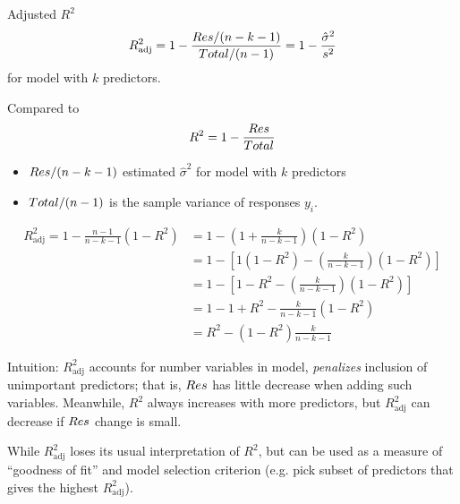 \begin{Definition}{Adjusted $ R^2 $}{}
      \[ R^2_{\text{adj}}=1-\frac{\relax{Res}/(n-k-1)}{
                  \relax{Total}/(n-1)
            }=1-\frac{\hat{\sigma}^2}{s^2}  \]
      for model with $ k $ predictors.
\end{Definition}
Compared to
\[ R^2=1-\frac{\relax{Res}}{\relax{Total}}  \]
\begin{itemize}
      \item $ \relax{Res}/(n-k-1) $
            estimated $ \hat{\sigma}^2 $
            for model with $ k $ predictors
      \item $ \relax{Total}/(n-1) $ is the sample variance
            of responses $ y_i $.
\end{itemize}
\begin{align*}
      R^2_{\text{adj}}=1-\frac{n-1}{n-k-1}(1-R^2)
       & = 1-\left( 1+\frac{k}{n-k-1} \right)
      (1-R^2)                                                             \\
       & =1-\left[ 1(1-R^2)-\left( \frac{k}{n-k-1} \right)(1-R^2) \right] \\
       & =1-\left[ 1-R^2-\left( \frac{k}{n-k-1}  \right)(1-R^2) \right]   \\
       & =1-1+R^2-\frac{k}{n-k-1} (1-R^2)                                 \\
       & =R^2-(1-R^2)\frac{k}{n-k-1}
\end{align*}

Intuition: $ R^2_{\text{adj}} $
accounts for number variables in model,
\emph{penalizes} inclusion of unimportant
predictors; that is, $ \relax{Res} $
has little decrease when adding
such variables. Meanwhile, $ R^2 $
always increases with more predictors,
but $ R^2_{\text{adj}} $ can decrease
if $ \relax{Res} $ change is small.

While $ R^2_{\text{adj}} $ loses its usual
interpretation of $ R^2 $, but can be used
as a measure of ``goodness of fit''
and model selection criterion (e.g.
pick subset of predictors that gives the highest
$ R^2_{\text{adj}} $).


